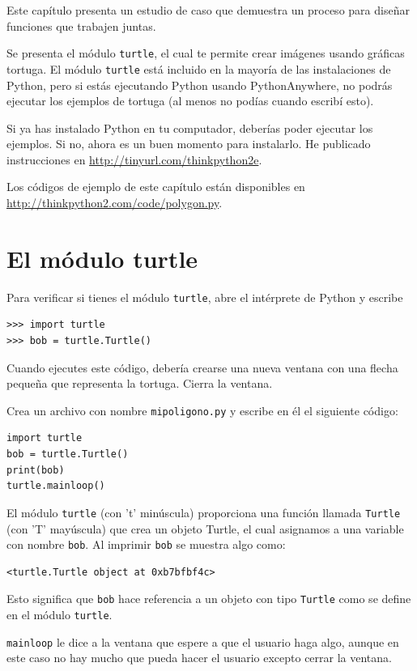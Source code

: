 \documentclass[10pt]{book}
\begin{document}
Este capítulo presenta un estudio de caso que demuestra un proceso para
diseñar funciones que trabajen juntas.

Se presenta el módulo {\tt turtle}, el cual te permite
crear imágenes usando gráficas tortuga.  El módulo {\tt turtle}
está incluido en la mayoría de las instalaciones de Python, pero si estás ejecutando Python
usando PythonAnywhere, no podrás ejecutar los ejemplos de tortuga (al
menos no podías cuando escribí esto).

Si ya has instalado Python en tu computador, deberías
poder ejecutar los ejemplos.  Si no, ahora es un buen momento
para instalarlo.  He publicado instrucciones en
\url{http://tinyurl.com/thinkpython2e}.

Los códigos de ejemplo de este capítulo están disponibles en
\url{http://thinkpython2.com/code/polygon.py}.


\section{El módulo turtle}
\label{turtle}

Para verificar si tienes el módulo {\tt turtle}, abre el intérprete de Python
y escribe

\begin{verbatim}
>>> import turtle
>>> bob = turtle.Turtle()
\end{verbatim}

Cuando ejecutes este código, debería crearse una nueva ventana
con una flecha pequeña que representa la tortuga.  Cierra la ventana.

Crea un archivo con nombre {\tt mipoligono.py} y escribe en él el siguiente
código:

\begin{verbatim}
import turtle
bob = turtle.Turtle()
print(bob)
turtle.mainloop()
\end{verbatim}
%
El módulo {\tt turtle} (con 't' minúscula) proporciona una función
llamada {\tt Turtle} (con 'T' mayúscula) que crea un objeto Turtle,
el cual asignamos a una variable con nombre {\tt bob}.
Al imprimir {\tt bob} se muestra algo como:

\begin{verbatim}
<turtle.Turtle object at 0xb7bfbf4c>
\end{verbatim}
%
Esto significa que {\tt bob} hace referencia a un objeto con tipo
{\tt Turtle}
como se define en el módulo {\tt turtle}.

\verb"mainloop" le dice a la ventana que espere a que el usuario
haga algo, aunque en este caso no hay mucho que pueda hacer
el usuario excepto cerrar la ventana.
\end{document}
